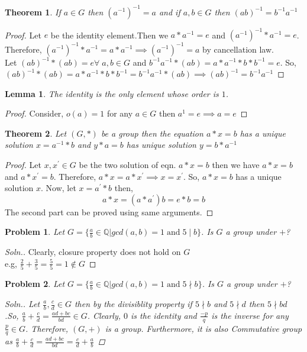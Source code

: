 \documentclass[12pt,a4paper]{article}
\newcommand{\Q}{\mathbb{Q}}
\newtheorem{thm}{Theorem}
\newtheorem{lem}{Lemma}
\newtheorem{pbm}{Problem}
\begin{document}
  \begin{thm} 
  If $a\in G$ then $(a^{-1})^{-1}=a$ and if $a,b\in G$ then $(ab)^{-1}=b^{-1}a^{-1}$
  \end{thm}
  \begin{proof}
    Let $e$ be the identity element.Then we $a*a^{-1}=e$ and $(a^{-1})^{-1}*a^{-1}=e$. Therefore, $(a^{-1})^{-1}*a^{-1}=a*a^{-1} \implies (a^{-1})^{-1}=a$ by cancellation law.\\
    Let $(ab)^{-1}*(ab)=e \forall \; a,b \in G$ and $b^{-1}a^{-1}*(ab)=a*a^{-1}*b*b^{-1}=e$. So, $(ab)^{-1}*(ab)=a*a^{-1}*b*b^{-1} = b^{-1}a^{-1}*(ab) \implies (ab)^{-1}= b^{-1}a^{-1}$ 
  \end{proof}
  \begin{lem}
    The identity is the only element whose order is $1$.
  \end{lem}
  \begin{proof}
    Consider, $o(a)=1$ for any $a\in G$ then $a^1=e \implies a=e$
  \end{proof}
  \begin{thm}
    Let $(G,*)$ be a group then the equation $a*x=b$ has a unique solution $x=a^{-1}*b$ and $y*a=b$ has unique solution $y=b*a^{-1}$
  \end{thm}
  \begin{proof}
    Let $x,x^{\prime} \in G$ be the two solution of eqn. $a*x=b$ then we have $a*x=b$ and $a*x^{\prime}=b$. Therefore,  $a*x=a*x^{\prime} \implies x=x^{\prime}$. So, $a*x=b$ has a unique solution $x$. Now, let $x=a^{\prime}*b$ then,
    $$a*x=(a*a^{\prime})b=e*b=b$$
    The second part can be proved using same arguments.
  \end{proof}
  \begin{pbm}
    Let $G=\{\frac{a}{b} \in \Q | gcd(a,b)=1 \;\text{and}\; 5\mid b \}$. Is $G$ a group under $+$?
  \end{pbm}
  \begin{proof}[Soln.]
    Clearly, closure property does not hold on $G$\\
    e.g, $\frac{2}{5} + \frac{3}{5} = \frac{5}{5} = 1 \notin G$
  \end{proof}
  \begin{pbm}
    Let $G=\{\frac{a}{b} \in \Q | gcd(a,b)=1 \;\text{and}\; 5 \nmid b \}$. Is $G$ a group under $+$?
    \begin{proof}[Soln.]
      Let $\frac{a}{b},\frac{c}{d} \in G$  then by the divisiblity property if $5\nmid b$ and $5\nmid d$ then $5\nmid bd$ .So,
      $\frac{a}{b} + \frac{c}{d} = \frac{ad+bc}{bd} \in G$. Clearly, $0$ is the identity and $\frac{-p}{q}$ is the inverse for any $\frac{p}{q}\in G$. Therefore, $(G,+)$ is a group. Furthermore, it is also Commutative group as $\frac{a}{b} + \frac{c}{d} = \frac{ad+bc}{bd} = \frac{c}{d}+\frac{a}{b}$
    \end{proof}
  \end{pbm}
\end{document}
